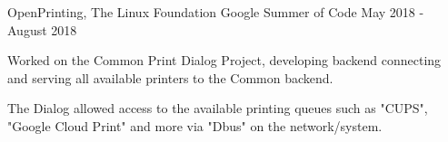 \begin{cventries}

  \cventry
    {OpenPrinting, The Linux Foundation} %
    {Google Summer of Code} %
    {} %
    {May 2018 - August 2018} %
    {
      \begin{cvitems} %
        \item {Worked on the Common Print Dialog Project, developing backend connecting and serving all available printers to the Common backend.}
        \item {The Dialog allowed access to the available printing queues such as "CUPS", "Google Cloud Print" and more via "Dbus" on the network/system.}
      \end{cvitems}
    }



\end{cventries}
